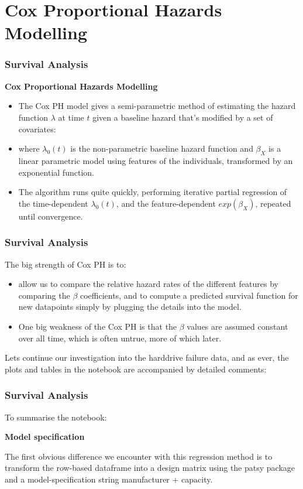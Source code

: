 \documentclass[]{beamer}
\begin{document}
	\section{Cox Proportional Hazards Modelling}
	\begin{frame}
		\frametitle{Survival Analysis}
		\noindent \textbf{Cox Proportional Hazards Modelling}
		\begin{itemize}
			\item The Cox PH model gives a semi-parametric method of estimating the hazard function $\lambda$ at time $t$ given a baseline hazard that's modified by a set of covariates:
			
			
			\item where $\lambda_0(t)$ is the non-parametric baseline hazard function and $\beta_X$ is a linear parametric model using features of the individuals, transformed by an exponential function.
			
			\item The algorithm runs quite quickly, performing iterative partial regression of the time-dependent $\lambda_0(t)$, and the feature-dependent $exp(\beta_X)$, repeated until convergence.
		\end{itemize}
		
		
	\end{frame}
	\begin{frame}
		\frametitle{Survival Analysis}
		The big strength of Cox PH is to:
		\begin{itemize}
			\item allow us to compare the relative hazard rates of the different features by comparing the $\beta$ coefficients, and to
			compute a predicted survival function for new datapoints simply by plugging the details into the model.
			\item 	One big weakness of the Cox PH is that the $\beta$ values are assumed constant over all time, which is often untrue, more of which later.
			
		\end{itemize}
		
		Lets continue our investigation into the harddrive failure data, and as ever, the plots and tables in the notebook are accompanied by detailed comments:
	\end{frame}
	\begin{frame}
		\frametitle{Survival Analysis}
		
		To summarise the notebook:
		
		\textbf{Model specification}
		
		The first obvious difference we encounter with this regression method is to transform the row-based dataframe into a design matrix using the patsy package and a model-specification string manufacturer + capacity. 
		
		
	\end{frame}
\end{document}

